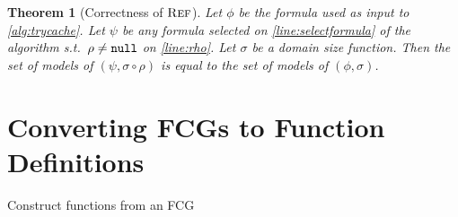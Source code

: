 \documentclass{article}
\newtheorem{theorem}{Theorem}
\theoremstyle{definition}
\theoremstyle{remark}
\DeclareMathOperator{\Reff}{\textsc{Ref}}
\begin{document}
\begin{theorem}[Correctness of $\Reff$]
  Let $\phi$ be the formula used as input to \cref{alg:trycache}. Let $\psi$ be
  any formula selected on \cref{line:selectformula} of the algorithm s.t.\
  $\rho \ne {\normalfont\texttt{null}}$ on \cref{line:rho}. Let $\sigma$ be a
  domain size function. Then the set of models of $(\psi, \sigma \circ \rho)$ is
  equal to the set of models of $(\phi, \sigma)$.
\end{theorem}

\section{Converting FCGs to Function Definitions}\label{sec:interpret}

\begin{algorithm}[t]
  \caption{Construct functions from an FCG}\label{alg:interpretation}
  \SetKwProg{Fn}{Function}{:}{}




\end{algorithm}
\end{document}
